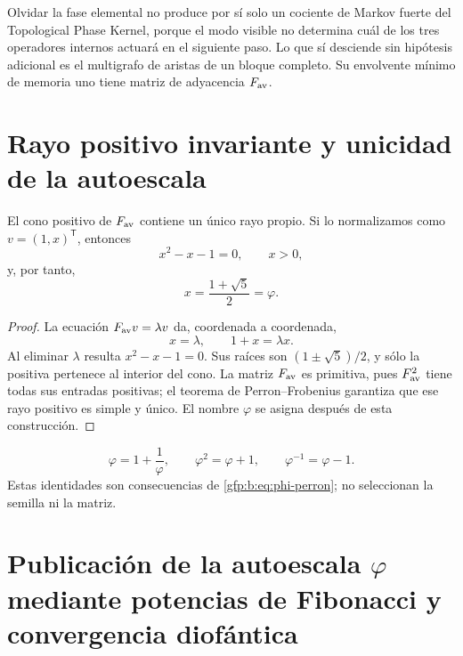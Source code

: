 \begin{remark}
Olvidar la fase elemental no produce por sí solo un cociente de Markov
fuerte del Topological Phase Kernel, porque el modo visible no determina
cuál de los tres operadores internos actuará en el siguiente paso. Lo que
sí desciende sin hipótesis adicional es el multigrafo de aristas de un
bloque completo. Su envolvente mínimo de memoria uno tiene matriz de
adyacencia \(F_{\rm av}\).
\end{remark}

\section{Rayo positivo invariante y unicidad de la autoescala}

\begin{theorem}
\label{gfp:b:thm:rayo-perron-phi}
El cono positivo de \(F_{\rm av}\) contiene un único rayo propio. Si lo
normalizamos como \(v=(1,x)^{\mathsf T}\), entonces
\[
 x^2-x-1=0,
 \qquad
 x>0,
\]
y, por tanto,
\begin{equation}
 \boxed{x=\frac{1+\sqrt5}{2}=\varphi.}
 \label{gfp:b:eq:phi-perron}
\end{equation}
\end{theorem}

\begin{proof}
La ecuación \(F_{\rm av}v=\lambda v\) da, coordenada a coordenada,
\[
 x=\lambda,
 \qquad
 1+x=\lambda x.
\]
Al eliminar \(\lambda\) resulta \(x^2-x-1=0\). Sus raíces son
\((1\pm\sqrt5)/2\), y sólo la positiva pertenece al interior del cono. La
matriz \(F_{\rm av}\) es primitiva, pues \(F_{\rm av}^2\) tiene todas sus
entradas positivas; el teorema de Perron--Frobenius garantiza que ese rayo
positivo es simple y único. El nombre \(\varphi\) se asigna después de esta
construcción.
\end{proof}

\begin{corollary}
\[
 \varphi=1+\frac1\varphi,
 \qquad
 \varphi^2=\varphi+1,
 \qquad
 \varphi^{-1}=\varphi-1.
\]
Estas identidades son consecuencias de \eqref{gfp:b:eq:phi-perron}; no seleccionan
la semilla ni la matriz.
\end{corollary}

\section{Publicación de la autoescala \(\varphi\) mediante potencias de Fibonacci y convergencia diofántica}

